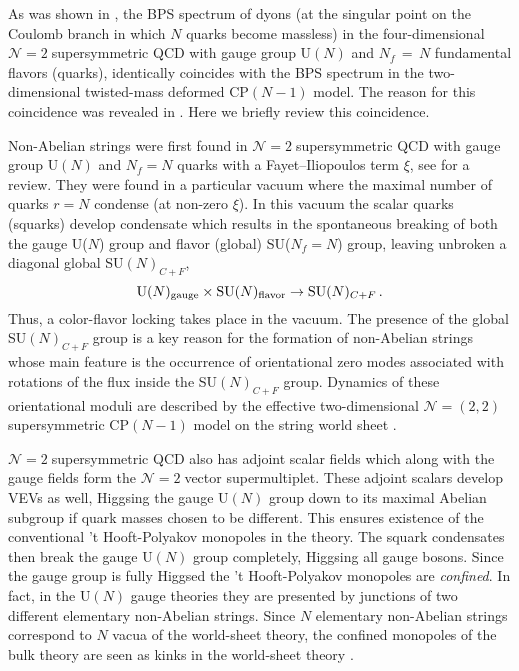 \documentclass[epsfig,12pt]{article}
\def\beq{\begin{equation}}
\def\eeq{\end{equation}}
\newcommand{\ntwo}{${\mathcal N}=2\;$}
\def\beq{\begin{equation}}
\def\eeq{\end{equation}}
\newcommand{\ntwot}{${\mathcal N}= \left(2,2\right) $ }
\begin{document}
	As was shown in \cite{Dorey:1998yh},
	the BPS spectrum of dyons (at the singular point on the Coulomb branch 
	in which  $ N $ quarks become massless) in the
	four-dimensional \ntwo supersymmetric QCD with gauge group U$(N)$ and  $ N_f\,=\,N $ fundamental flavors (quarks), identically
	coincides with the BPS spectrum in the two-dimensional twisted-mass deformed CP$(N-1)$ model.
	The reason for this coincidence was revealed 
	in \cite{Shifman:2004dr,4}. 
	Here we briefly review this coincidence.

	Non-Abelian strings \cite{1,2} were first found in \ntwo supersymmetric QCD with gauge group U$(N)$ and  $N_f=N$ quarks 
	with a Fayet--Iliopoulos term $\xi$, see \cite{Trev,Jrev,SYrev,Trev2} for a review.
	They were found in a particular vacuum where the maximal number of quarks $r=N$ condense (at non-zero $\xi$).
	In this vacuum the scalar quarks (squarks) develop condensate which results in  the spontaneous
	breaking of both the gauge U($N$) group and flavor (global) SU($N_f=N$) group, leaving unbroken a
	diagonal global SU$(N)_{C+F}$,
\beq
{\rm U}(N)_{\rm gauge}\times {\rm SU}(N)_{\rm flavor}
\to {\rm SU}(N)_{C+F}\,.
\label{c+f}
\eeq
	Thus, a color-flavor locking takes place in the vacuum.
	The presence of the global SU$(N)_{C+F}$ group is a key reason for the
	formation of non-Abelian strings whose main feature is
	the occurrence  of orientational zero modes associated with rotations of the flux
	inside the  SU$(N)_{C+F}$ group. 
	Dynamics of these orientational moduli are described by
	the effective two-dimensional   \ntwot supersymmetric CP$(N-1)$ model on
	the string world sheet \cite{1,2,Shifman:2004dr,4}. 


	\ntwo supersymmetric QCD also has adjoint scalar fields which along with the gauge fields form the \ntwo vector supermultiplet. 
	These  adjoint scalars develop  VEVs as well, Higgsing the gauge U$(N)$ group
	down to its maximal Abelian subgroup if quark masses chosen to be different.
	This ensures existence of the conventional  't Hooft-Polyakov monopoles in the theory.
	The squark condensates then break the gauge U$(N)$ group completely, Higgsing all gauge bosons.
	Since  the gauge group is fully Higgsed the 't Hooft-Polyakov monopoles are {\em confined}.  
	In fact, in the   U$(N)$ gauge theories they are presented by junctions of two  different elementary non-Abelian strings.
	Since $N$ elementary non-Abelian strings correspond to $N$ vacua of the world-sheet theory,
	the   confined monopoles of the bulk theory are seen as kinks in the world-sheet 
	theory \cite{Tong,Shifman:2004dr,4}.
\end{document}
